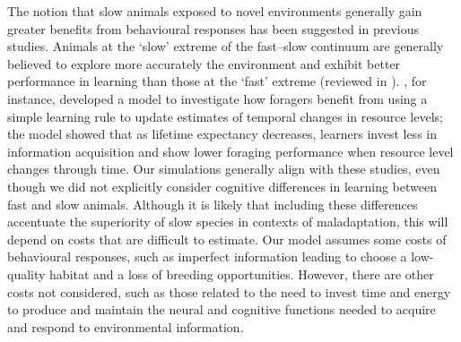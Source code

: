 The notion that slow animals exposed to novel environments
generally gain greater benefits from behavioural responses has
been suggested in previous studies. Animals at the ‘slow’
extreme of the fast–slow continuum are generally believed to
explore more accurately the environment and exhibit better performance
in learning than those at the ‘fast’ extreme (reviewed in \citet{Sol2016}
). \citet{Eliassen2007}, for instance, developed a model to investigate
how foragers benefit from using a simple learning rule to
update estimates of temporal changes in resource levels; the
model showed that as lifetime expectancy decreases, learners
invest less in information acquisition and show lower foraging
performance when resource level changes through time. Our
simulations generally align with these studies, even though we
did not explicitly consider cognitive differences in learning
between fast and slow animals. Although it is likely that including
these differences accentuate the superiority of slow species in
contexts of maladaptation, this will depend on costs that are difficult
to estimate. Our model assumes some costs of behavioural
responses, such as imperfect information leading to choose a
low-quality habitat and a loss of breeding opportunities. However,
there are other costs not considered, such as those related
to the need to invest time and energy to produce and maintain
the neural and cognitive functions needed to acquire and
respond to environmental information.

